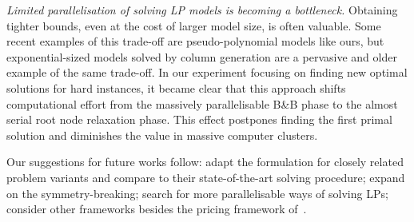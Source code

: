 \documentclass[smallextended]{svjour3}       %
\begin{document}
\emph{Limited parallelisation of solving LP models is becoming a bottleneck.}
Obtaining tighter bounds, even at the cost of larger model size, is often valuable.
Some recent examples of this trade-off are pseudo-polynomial models like ours, but exponential-sized models solved by column generation are a pervasive and older example of the same trade-off.
In our experiment focusing on finding new optimal solutions for hard instances, it became clear that this approach shifts computational effort from the massively parallelisable B\&B phase to the almost serial root node relaxation phase.
This effect postpones finding the first primal solution and diminishes the value in massive computer clusters.

Our suggestions for future works follow: adapt the formulation for closely related problem variants and compare to their state-of-the-art solving procedure; expand on the symmetry-breaking; search for more parallelisable ways of solving LPs; consider other frameworks besides the pricing framework of~\cite{furini:2016}.


%
%
%
\end{document}
